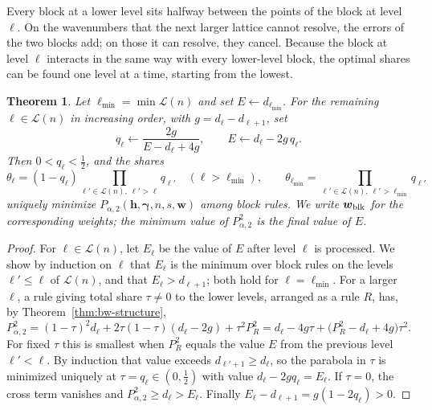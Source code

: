 \documentclass[preprint,12pt,authoryear]{elsarticle}
\newtheorem{theorem}{Theorem}
\begin{document}
Every block at a lower level sits halfway between the points of the block
at level $\ell$. On the wavenumbers that the next larger lattice cannot
resolve, the errors of the two blocks add; on those it can resolve, they
cancel. Because the block at level $\ell$ interacts in the same way with
every lower-level block, the optimal shares can be found one level at a
time, starting from the lowest.

\begin{theorem}\label{thm:bw-recursion}
Let $\ell_{\min}=\min\mathcal L(n)$ and set $E\leftarrow d_{\ell_{\min}}$.
For the remaining $\ell\in\mathcal L(n)$ in increasing order, with
$g=d_\ell-d_{\ell+1}$, set
\begin{equation}\label{eq:bw-rec}
 q_\ell\leftarrow\frac{2g}{E-d_\ell+4g},\qquad E\leftarrow d_\ell-2g\,q_\ell .
\end{equation}
Then $0<q_\ell<\tfrac12$, and the shares
\[
 \theta_\ell=(1-q_\ell)\prod_{\ell'\in\mathcal L(n),\ \ell'>\ell}q_{\ell'}
 \quad(\ell>\ell_{\min}),\qquad
 \theta_{\ell_{\min}}=\prod_{\ell'\in\mathcal L(n),\ \ell'>\ell_{\min}}q_{\ell'}
\]
uniquely minimize $P_{\alpha,2}(\boldsymbol h,\boldsymbol\gamma,n,s,\boldsymbol w)$
among block rules. We write $\boldsymbol w_{\rm blk}$ for the corresponding
weights; the minimum value of $P_{\alpha,2}^2$ is the final value of $E$.
\end{theorem}

\begin{proof}
For $\ell\in\mathcal L(n)$, let $E_\ell$ be the value of $E$ after level
$\ell$ is processed. We show by induction on $\ell$ that $E_\ell$ is the
minimum over block rules on the levels $\ell'\le\ell$ of $\mathcal L(n)$,
and that $E_\ell>d_{\ell+1}$; both hold for $\ell=\ell_{\min}$. For a larger
$\ell$, a rule giving total share $\tau\neq0$ to the lower levels, arranged
as a rule $R$, has, by Theorem~\ref{thm:bw-structure},
\[
 P_{\alpha,2}^2=(1-\tau)^2d_\ell+2\tau(1-\tau)(d_\ell-2g)+\tau^2P_R^2
 =d_\ell-4g\tau+\bigl(P_R^2-d_\ell+4g\bigr)\tau^2 .
\]
For fixed $\tau$ this is smallest when $P_R^2$ equals the value $E$ from
the previous level $\ell'<\ell$. By induction that value exceeds
$d_{\ell'+1}\ge d_\ell$, so the parabola in $\tau$ is minimized uniquely at
$\tau=q_\ell\in(0,\tfrac12)$ with value $d_\ell-2gq_\ell=E_\ell$. If
$\tau=0$, the cross term vanishes and $P_{\alpha,2}^2\ge d_\ell>E_\ell$.
Finally $E_\ell-d_{\ell+1}=g(1-2q_\ell)>0$.
\end{proof}
\end{document}
